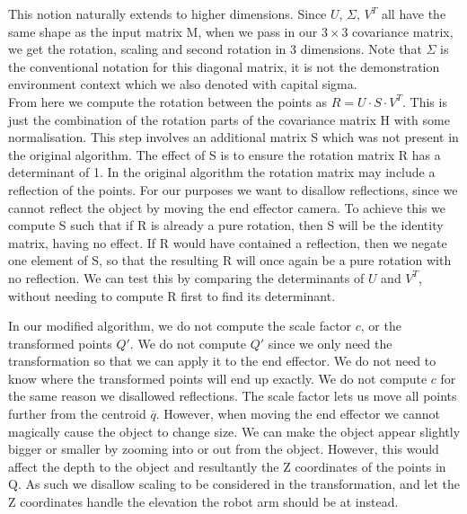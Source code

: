 This notion naturally extends to higher dimensions. Since $U$, $\Sigma$, $V^T$ all have the same shape as the input matrix M, when we pass in our $3 \times 3$ covariance matrix, we get the rotation, scaling and second rotation in 3 dimensions. Note that $\Sigma$ is the conventional notation for this diagonal matrix, it is not the demonstration environment context which we also denoted with capital sigma.\\

From here we compute the rotation between the points as $R = U \cdot S \cdot V^T$. This is just the combination of the rotation parts of the covariance matrix H with some normalisation. This step involves an additional matrix S which was not present in the original algorithm. The effect of S is to ensure the rotation matrix R has a determinant of 1. In the original algorithm the rotation matrix may include a reflection of the points. For our purposes we want to disallow reflections, since we cannot reflect the object by moving the end effector camera. To achieve this we compute S such that if R is already a pure rotation, then S will be the identity matrix, having no effect. If R would have contained a reflection, then we negate one element of S, so that the resulting R will once again be a pure rotation with no reflection. We can test this by comparing the determinants of $U$ and $V^T$, without needing to compute R first to find its determinant.


In our modified algorithm, we do not compute the scale factor $c$, or the transformed points $Q'$. We do not compute $Q'$ since we only need the transformation so that we can apply it to the end effector. We do not need to know where the transformed points will end up exactly. We do not compute $c$ for the same reason we disallowed reflections. The scale factor lets us move all points further from the centroid $\overline{q}$. However, when moving the end effector we cannot magically cause the object to change size. We can make the object appear slightly bigger or smaller by zooming into or out from the object. However, this would affect the depth to the object and resultantly the Z coordinates of the points in Q. As such we disallow scaling to be considered in the transformation, and let the Z coordinates handle the elevation the robot arm should be at instead.\\

